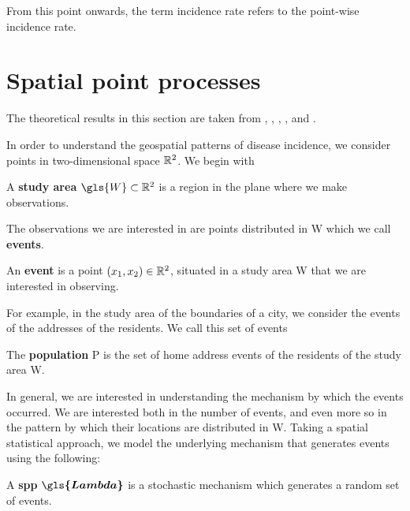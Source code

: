 From this point onwards, the term \gls{incidence rate} refers to the point-wise \gls{incidence rate}.

\section{Spatial point processes}
\label{sec:theory:spatial_point_processes}

The theoretical results in this section are taken from \citet{diggle1983spatial},
\citet{diggle1988equivalence},
\citet{guan2008consistent},
\citet{silverman1986density},
and \citet{wand1994kernel}.

In order to understand the geospatial patterns of disease incidence,
we consider points in two-dimensional space $\mathbb{R}^2$.
We begin with

\begin{defn}
    \label{defn:studyarea}
    A \textbf{study area} $\gls{W} \subset \RS$ is a region in the plane where we make observations.
\end{defn}

The observations we are interested in are points distributed in \gls{W} which we call \textbf{events}.

\begin{defn}
    \label{defn:event}
    An \textbf{event} is a point $(x_1, x_2) \in \mathbb{R}^2$, situated in a study area \gls{W} that we are interested in observing.
\end{defn}

For example, in the study area of the boundaries of a city, we consider the events of the addresses of the residents.
We call this set of events

\begin{defn}
    The \textbf{population} \gls{P} is the set of home address events of the residents of the study area \gls{W}.
\end{defn}

In general, we are interested in understanding the mechanism by which the events occurred.
We are interested both in the number of events, and even more so in the pattern by which their locations are distributed in \gls{W}.
Taking a spatial statistical approach, we model the underlying mechanism that generates events using the following:

\begin{defn}
    \label{defn:spp}
    A \textbf{\gls{spp}} $\boldsymbol{\gls{Lambda}}$ is a stochastic mechanism which generates a random set of events.
\end{defn}

